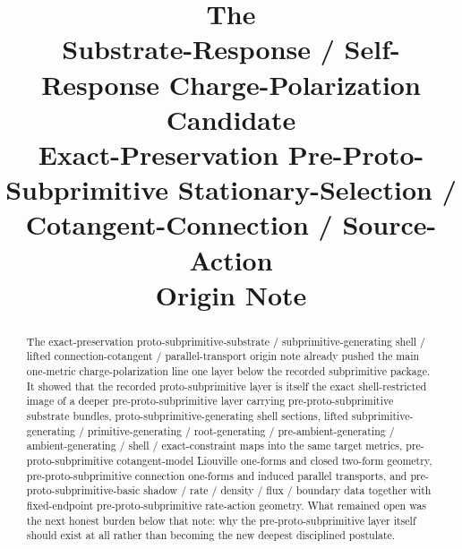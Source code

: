 \documentclass[11pt]{article}
\title{\textbf{The \TheoryName{}}\\[0.4em]
\large Substrate-Response / Self-Response Charge-Polarization Candidate\\
\large Exact-Preservation Pre-Proto-Subprimitive Stationary-Selection / Cotangent-Connection / Source-Action\\
\large Origin Note}
\author{}
\date{}
\begin{document}
\maketitle

\begin{abstract}
The exact-preservation proto-subprimitive-substrate / subprimitive-generating shell / lifted connection-cotangent / parallel-transport origin note already pushed the main one-metric charge-polarization line one layer below the recorded subprimitive package. It showed that the recorded proto-subprimitive layer is itself the exact shell-restricted image of a deeper pre-proto-subprimitive layer carrying pre-proto-subprimitive substrate bundles, proto-subprimitive-generating shell sections, lifted subprimitive-generating / primitive-generating / root-generating / pre-ambient-generating / ambient-generating / shell / exact-constraint maps into the same target metrics, pre-proto-subprimitive cotangent-model Liouville one-forms and closed two-form geometry, pre-proto-subprimitive connection one-forms and induced parallel transports, and pre-proto-subprimitive-basic shadow / rate / density / flux / boundary data together with fixed-endpoint pre-proto-subprimitive rate-action geometry. What remained open was the next honest burden below that note: why the pre-proto-subprimitive layer itself should exist at all rather than becoming the new deepest disciplined postulate.


\end{abstract}
\end{document}

